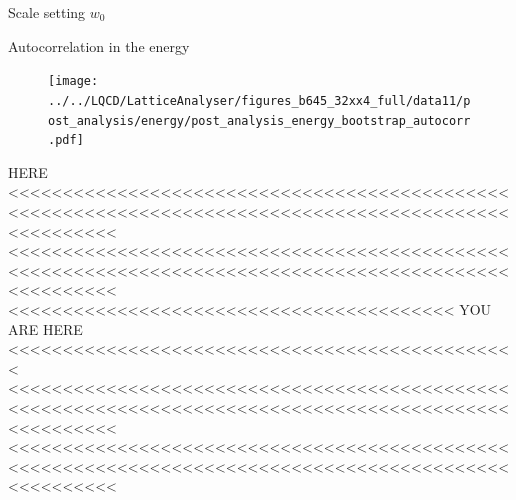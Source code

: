\documentclass[10pt,show notes on second screen]{beamer}
\begin{document}
\begin{frame}{Scale setting \texorpdfstring{$w_0$}{w0}}
\end{frame}

\begin{frame}{Autocorrelation in the energy}
\begin{figure}
    \centering
    \texttt{[image: ../../LQCD/LatticeAnalyser/figures\_b645\_32xx4\_full/data11/post\_analysis/energy/post\_analysis\_energy\_bootstrap\_autocorr.pdf]}
\end{figure}
\end{frame}


\begin{frame}{HERE}
<<<<<<<<<<<<<<<<<<<<<<<<<<<<<<<<<<<<<<<<<<<<<<<<<<<<<<<<<<<<<<<<<<<<<<<<<<<<<<<<<<<<<<<<<<<<<<<<<<<<<<
<<<<<<<<<<<<<<<<<<<<<<<<<<<<<<<<<<<<<<<<<<<<<<<<<<<<<<<<<<<<<<<<<<<<<<<<<<<<<<<<<<<<<<<<<<<<<<<<<<<<<<
<<<<<<<<<<<<<<<<<<<<<<<<<<<<<<<<<<<<<<<<< YOU ARE HERE <<<<<<<<<<<<<<<<<<<<<<<<<<<<<<<<<<<<<<<<<<<<<<<
<<<<<<<<<<<<<<<<<<<<<<<<<<<<<<<<<<<<<<<<<<<<<<<<<<<<<<<<<<<<<<<<<<<<<<<<<<<<<<<<<<<<<<<<<<<<<<<<<<<<<<
<<<<<<<<<<<<<<<<<<<<<<<<<<<<<<<<<<<<<<<<<<<<<<<<<<<<<<<<<<<<<<<<<<<<<<<<<<<<<<<<<<<<<<<<<<<<<<<<<<<<<<
\end{frame}
\end{document}
